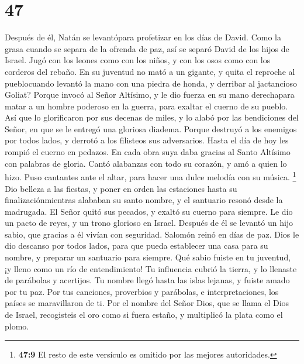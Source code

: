 \hypertarget{section-46}{%
\section{47}\label{section-46}}

 Después de él, Natán se levantópara profetizar en los
días de David.  Como la grasa cuando se separa de la
ofrenda de paz, así se separó David de los hijos de Israel.
 Jugó con los leones como con los niños, y con los osos
como con los corderos del rebaño.  En su juventud no mató
a un gigante, y quita el reproche al pueblocuando levantó la mano con
una piedra de honda, y derribar al jactancioso Goliat? 
Porque invocó al Señor Altísimo, y le dio fuerza en su mano derechapara
matar a un hombre poderoso en la guerra, para exaltar el cuerno de su
pueblo.  Así que lo glorificaron por sus decenas de miles,
y lo alabó por las bendiciones del Señor, en que se le entregó una
gloriosa diadema.  Porque destruyó a los enemigos por
todos lados, y derrotó a los filisteos sus adversarios. Hasta el día de
hoy les rompió el cuerno en pedazos.  En cada obra suya
daba gracias al Santo Altísimo con palabras de gloria. Cantó alabanzas
con todo su corazón, y amó a quien lo hizo.  Puso
cantantes ante el altar, para hacer una dulce melodía con su música.
\footnote{\textbf{47:9} El resto de este versículo es omitido por las
  mejores autoridades.}  Dio belleza a las fiestas, y
poner en orden las estaciones hasta su finalizaciónmientras alababan su
santo nombre, y el santuario resonó desde la madrugada. 
El Señor quitó sus pecados, y exaltó su cuerno para siempre. Le dio un
pacto de reyes, y un trono glorioso en Israel.  Después
de él se levantó un hijo sabio, que gracias a él vivían con seguridad.
 Salomón reinó en días de paz. Dios le dio descanso por
todos lados, para que pueda establecer una casa para su nombre, y
preparar un santuario para siempre.  Qué sabio fuiste en
tu juventud, ¡y lleno como un río de entendimiento!  Tu
influencia cubrió la tierra, y lo llenaste de parábolas y acertijos.
 Tu nombre llegó hasta las islas lejanas, y fuiste amado
por tu paz.  Por tus canciones, proverbios y parábolas, e
interpretaciones, los países se maravillaron de ti.  Por
el nombre del Señor Dios, que se llama el Dios de Israel, recogisteis el
oro como si fuera estaño, y multiplicó la plata como el plomo.
